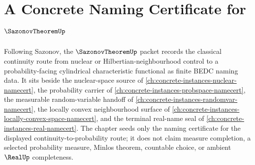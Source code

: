\chapter{A Concrete Naming Certificate for $\SazonovTheoremUp$}
\label{ch:concrete-instances-sazonov-theorem-namecert}

Following Sazonov, the $\SazonovTheoremUp$ packet records the classical continuity route from nuclear or Hilbertian-neighbourhood control to a probability-facing cylindrical characteristic functional as finite BEDC naming data. It sits beside the nuclear-space source of \autoref{ch:concrete-instances-nuclear-namecert}, the probability carrier of \autoref{ch:concrete-instances-probspace-namecert}, the measurable random-variable handoff of \autoref{ch:concrete-instances-randomvar-namecert}, the locally convex neighbourhood surface of \autoref{ch:concrete-instances-locally-convex-space-namecert}, and the terminal real-name seal of \autoref{ch:concrete-instances-real-namecert}. The chapter seeds only the naming certificate for the displayed continuity-to-probability route; it does not claim measure completion, a selected probability measure, Minlos theorem, countable choice, or ambient $\RealUp$ completeness.

